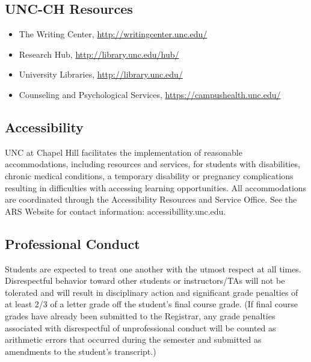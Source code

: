 \documentclass[11pt,]{article}
\providecommand{\tightlist}{%
  \setlength{\itemsep}{0pt}\setlength{\parskip}{0pt}}
\begin{document}
\hypertarget{unc-ch-resources}{%
\subsection{UNC-CH Resources}\label{unc-ch-resources}}

\begin{itemize}
\tightlist
\item
  The Writing Center, \url{http://writingcenter.unc.edu/}
\item
  Research Hub, \url{http://library.unc.edu/hub/}
\item
  University Libraries, \url{http://library.unc.edu/}
\item
  Counseling and Psychological Services,
  \url{https://campushealth.unc.edu/}
\end{itemize}

\hypertarget{accessibility}{%
\subsection{Accessibility}\label{accessibility}}

UNC at Chapel Hill facilitates the implementation of reasonable
accommodations, including resources and services, for students with
disabilities, chronic medical conditions, a temporary disability or
pregnancy complications resulting in difficulties with accessing
learning opportunities. All accommodations are coordinated through the
Accessibility Resources and Service Office. See the ARS Website for
contact information: accessibillity.unc.edu.

\hypertarget{professional-conduct}{%
\subsection{Professional Conduct}\label{professional-conduct}}

Students are expected to treat one another with the utmost respect at
all times. Disrespectful behavior toward other students or
instructors/TAs will not be tolerated and will result in disciplinary
action and significant grade penalties of at least 2/3 of a letter grade
off the student's final course grade. (If final course grades have
already been submitted to the Registrar, any grade penalties associated
with disrespectful of unprofessional conduct will be counted as
arithmetic errors that occurred during the semester and submitted as
amendments to the student's transcript.)
\end{document}
